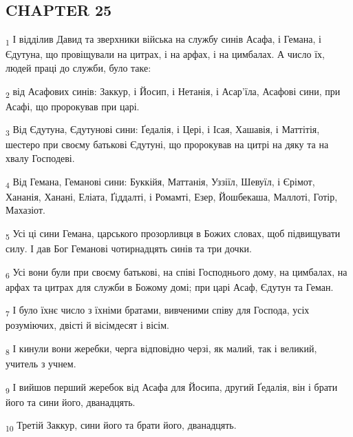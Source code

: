 \subsection{CHAPTER 25}
\begin{tcolorbox}
\textsubscript{1} І відділив Давид та зверхники війська на службу синів Асафа, і Гемана, і Єдутуна, що провіщували на цитрах, і на арфах, і на цимбалах. А число їх, людей праці до служби, було таке:
\end{tcolorbox}
\begin{tcolorbox}
\textsubscript{2} від Асафових синів: Заккур, і Йосип, і Нетанія, і Асар'їла, Асафові сини, при Асафі, що пророкував при царі.
\end{tcolorbox}
\begin{tcolorbox}
\textsubscript{3} Від Єдутуна, Єдутунові сини: Ґедалія, і Цері, і Ісая, Хашавія, і Маттітія, шестеро при своєму батькові Єдутуні, що пророкував на цитрі на дяку та на хвалу Господеві.
\end{tcolorbox}
\begin{tcolorbox}
\textsubscript{4} Від Гемана, Геманові сини: Буккійя, Маттанія, Уззіїл, Шевуїл, і Єрімот, Хананія, Ханані, Еліата, Ґіддалті, і Ромамті, Езер, Йошбекаша, Маллоті, Готір, Махазіот.
\end{tcolorbox}
\begin{tcolorbox}
\textsubscript{5} Усі ці сини Гемана, царського прозорливця в Божих словах, щоб підвищувати силу. І дав Бог Геманові чотирнадцять синів та три дочки.
\end{tcolorbox}
\begin{tcolorbox}
\textsubscript{6} Усі вони були при своєму батькові, на співі Господнього дому, на цимбалах, на арфах та цитрах для служби в Божому домі; при царі Асаф, Єдутун та Геман.
\end{tcolorbox}
\begin{tcolorbox}
\textsubscript{7} І було їхнє число з їхніми братами, вивченими співу для Господа, усіх розуміючих, двісті й вісімдесят і вісім.
\end{tcolorbox}
\begin{tcolorbox}
\textsubscript{8} І кинули вони жеребки, черга відповідно черзі, як малий, так і великий, учитель з учнем.
\end{tcolorbox}
\begin{tcolorbox}
\textsubscript{9} І вийшов перший жеребок від Асафа для Йосипа, другий Ґедалія, він і брати його та сини його, дванадцять.
\end{tcolorbox}
\begin{tcolorbox}
\textsubscript{10} Третій Заккур, сини його та брати його, дванадцять.
\end{tcolorbox}
